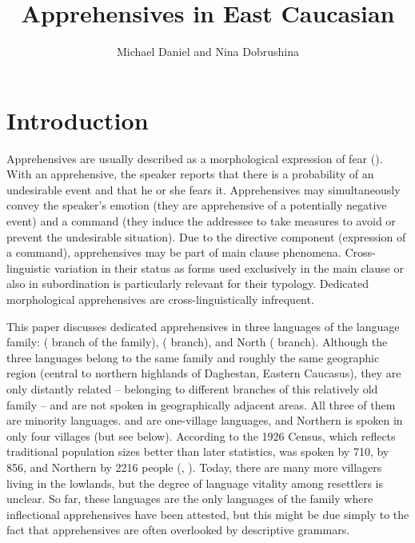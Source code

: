 \documentclass[output=paper,colorlinks,citecolor=brown]{langscibook}
\author{Michael Daniel\affiliation{Collegium de Lyon, University of Lyon} and Nina Dobrushina\affiliation{Laboratoire Dynamique du Langage (CNRS), Lyon}}
\title{Apprehensives in East Caucasian}
\begin{document}
\maketitle


\section{Introduction}

 
Apprehensives are usually described as a morphological expression of fear (\citealt{lichtenberk1995,Dobrushina2006cyrillic,vuillermet2018a,Smith-Dennis2021}). With an apprehensive, the speaker reports that there is a probability of an undesirable event and that he or she fears it. Apprehensives may simultaneously convey the speaker's emotion (they are apprehensive of a potentially negative event) and a command (they induce the addressee to take measures to avoid or prevent the undesirable situation). Due to the directive component (expression of a command), apprehensives may be part of main clause phenomena. Cross-linguistic variation in their status as forms used exclusively in the main clause or also in subordination is particularly relevant for their typology. Dedicated morphological apprehensives are cross-linguistically infrequent. 

This paper discusses dedicated apprehensives in three languages of the  language family:  ( branch of the family),  ( branch), and North  ( branch). Although the three languages belong to the same family and roughly the same geographic region (central to northern highlands of Daghestan, Eastern Caucasus), they are only distantly related -- belonging to different branches of this relatively old family -- and are not spoken in geographically adjacent areas. All three of them are minority languages.  and  are one-village languages, and Northern  is spoken in only four villages (but see below). According to the 1926 Census, which reflects traditional population sizes better than later statistics,  was spoken by 710,  by 856, and Northern  by 2216 people (\citealt{materials1927}, \citealt{Dobrushinaetal2017}). Today, there are many more villagers living in the lowlands, but the degree of language vitality among resettlers is unclear. So far, these languages are the only languages of the family where inflectional apprehensives have been attested, but this might be due simply to the fact that apprehensives are often overlooked by descriptive grammars.
\end{document}
